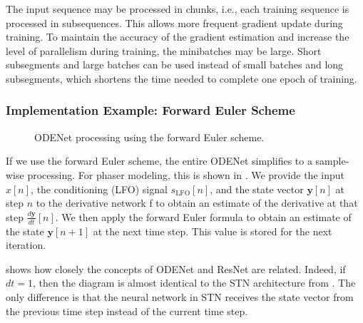 The input sequence may be processed in chunks, i.e., each training sequence is processed in subsequences. This allows more frequent gradient update during training. To maintain the accuracy of the gradient estimation and increase the level of parallelism during training, the minibatches may be large. Short subsegments and large batches can be used instead of small batches and long subsegments, which shortens the time needed to complete one epoch of training.

\subsubsection{Implementation Example: Forward Euler Scheme}
\label{subsec:odenet_fe}

\begin{figure}
    \centering
    \scalebox{0.7}{}
    \caption{ODENet processing using the forward Euler scheme.}
    \label{fig:odenet_fe_diagram}
\end{figure}

If we use the forward Euler scheme, the entire ODENet simplifies to a sample-wise processing. For phaser modeling, this is shown in . We provide the input $x[n]$, the conditioning (\ac{LFO}) signal $s_\text{LFO}[n]$, and the state vector $\pmb{y}[n]$ at step $n$ to the derivative network f to obtain an estimate of the derivative at that step $\frac{d\pmb{y}}{dt}[n]$. We then apply the forward Euler formula to obtain an estimate of the state $\pmb{y}[n+1]$ at the next time step. This value is stored for the next iteration.

 shows how closely the concepts of ODENet and \ac{ResNet} are related. Indeed, if $dt = 1$, then the diagram is almost identical to the \ac{STN} architecture from . The only difference is that the neural network in \ac{STN} receives the state vector from the previous time step instead of the current time step.
